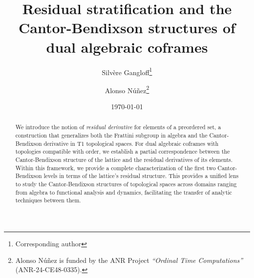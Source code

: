 \documentclass{article}
\title{Residual stratification and the Cantor-Bendixson structures of dual algebraic coframes}
\author[1]{Silvère Gangloff\footnote{Corresponding author}}
\affil[1]{
	University of Ostrava
    
    \url{silvere.gangloff@osu.cz}
	}
\author[2]{Alonso N\'u\~nez\footnote{Alonso N\'u\~nez is funded by the ANR Project \textit{``Ordinal Time Computations''} (ANR-24-CE48-0335).}}
\affil[2]{
\'Ecole Polytechnique

\url{anunez@lix.polytechnique.fr}
}
\date{\today}
\begin{document}
\maketitle

\begin{abstract}
    We introduce the notion of \textit{residual derivative} for elements of a preordered set, a construction that generalizes both the Frattini subgroup in algebra and the Cantor-Bendixson derivative in T1 topological spaces. For dual algebraic coframes with topologies compatible with order, we establish a partial correspondence between 
    the Cantor-Bendixson structure of the lattice
    and the residual derivatives of its elements. 
    Within this framework, we provide a complete characterization of the first two Cantor-Bendixson levels in terms of the lattice’s residual structure. This provides a unified lens%
    to study the Cantor-Bendixson structures of topological spaces across domains ranging from algebra to functional analysis and dynamics, facilitating the transfer of analytic techniques between them.
\end{abstract}



\end{document}
